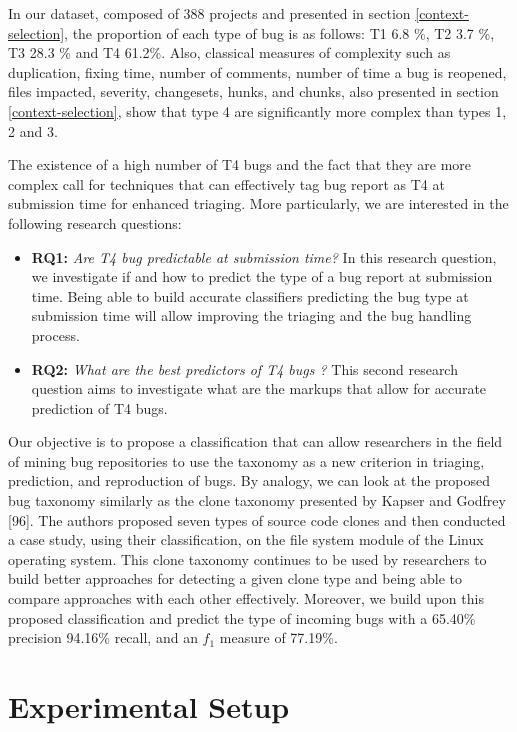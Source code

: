 \documentclass[12pt]{report}
\providecommand{\tightlist}{%
  \setlength{\itemsep}{0pt}\setlength{\parskip}{0pt}}
\begin{document}
In our dataset, composed of 388 projects and presented in section
\ref{context-selection}, the proportion of each type of bug is as
follows: T1 6.8 \%, T2 3.7 \%, T3 28.3 \% and T4 61.2\%. Also, classical
measures of complexity such as duplication, fixing time, number of
comments, number of time a bug is reopened, files impacted, severity,
changesets, hunks, and chunks, also presented in section
\ref{context-selection}, show that type 4 are significantly more complex
than types 1, 2 and 3.

The existence of a high number of T4 bugs and the fact that they are
more complex call for techniques that can effectively tag bug report as
T4 at submission time for enhanced triaging. More particularly, we are
interested in the following research questions:

\begin{itemize}
\tightlist
\item
  \textbf{RQ1:} \emph{Are T4 bug predictable at submission time?} In
  this research question, we investigate if and how to predict the type
  of a bug report at submission time. Being able to build accurate
  classifiers predicting the bug type at submission time will allow
  improving the triaging and the bug handling process.
\item
  \textbf{RQ2:} \emph{What are the best predictors of T4 bugs ?} This
  second research question aims to investigate what are the markups that
  allow for accurate prediction of T4 bugs.
\end{itemize}

Our objective is to propose a classification that can allow researchers
in the field of mining bug repositories to use the taxonomy as a new
criterion in triaging, prediction, and reproduction of bugs. By analogy,
we can look at the proposed bug taxonomy similarly as the clone taxonomy
presented by Kapser and Godfrey {[}96{]}. The authors proposed seven
types of source code clones and then conducted a case study, using their
classification, on the file system module of the Linux operating system.
This clone taxonomy continues to be used by researchers to build better
approaches for detecting a given clone type and being able to compare
approaches with each other effectively. Moreover, we build upon this
proposed classification and predict the type of incoming bugs with a
65.40\% precision 94.16\% recall, and an \(f_1\) measure of 77.19\%.

\section{Experimental Setup}\label{experimental-setup-4}
\end{document}
